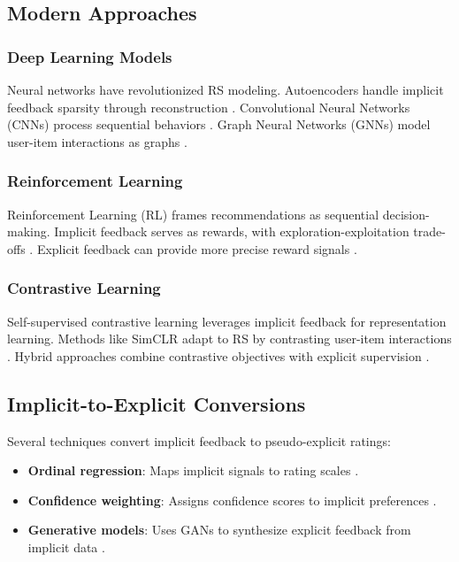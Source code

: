 \documentclass[acmsmall,review,anonymous]{acmart}
\begin{document}
\subsection{Modern Approaches}

\subsubsection{Deep Learning Models}
Neural networks have revolutionized RS modeling. Autoencoders handle implicit feedback sparsity through reconstruction \cite{sedhain2015autorec}. Convolutional Neural Networks (CNNs) process sequential behaviors \cite{tang2018personalized}. Graph Neural Networks (GNNs) model user-item interactions as graphs \cite{wang2019neural}.

\subsubsection{Reinforcement Learning}
Reinforcement Learning (RL) frames recommendations as sequential decision-making. Implicit feedback serves as rewards, with exploration-exploitation trade-offs \cite{zhao2018recommendations}. Explicit feedback can provide more precise reward signals \cite{chen2019large}.

\subsubsection{Contrastive Learning}
Self-supervised contrastive learning leverages implicit feedback for representation learning. Methods like SimCLR adapt to RS by contrasting user-item interactions \cite{wu2021self}. Hybrid approaches combine contrastive objectives with explicit supervision \cite{xie2022contrastive}.

\subsection{Implicit-to-Explicit Conversions}

Several techniques convert implicit feedback to pseudo-explicit ratings:
\begin{itemize}
    \item \textbf{Ordinal regression}: Maps implicit signals to rating scales \cite{weston2011wsabie}.
    \item \textbf{Confidence weighting}: Assigns confidence scores to implicit preferences \cite{he2016fast}.
    \item \textbf{Generative models}: Uses GANs to synthesize explicit feedback from implicit data \cite{wang2017irgan}.
\end{itemize}
\end{document}
